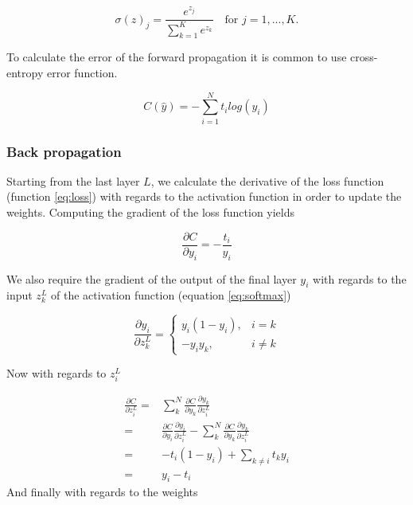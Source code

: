 \documentclass[thesis.tex]{subfiles}
\begin{document}
\begin{equation} %
  \sigma(z)_j = \frac{e^{z_j}}{\sum_{k=1}^{K} e^{z_k}} \quad \text{for } j = 1, ..., K.
  \label{eq:softmax}
\end{equation}

To calculate the error of the forward propagation it is common to use cross-entropy error function.

\begin{equation} %
  C(\hat{y}) = - \sum_{i=1}^N t_i log(y_i)
  \label{eq:loss}
\end{equation}


\subsubsection{Back propagation}
Starting from the last layer $L$, we calculate the derivative of the loss function (function \ref{eq:loss}) with regards to the activation function in order to update the weights. Computing the gradient of the loss function yields

\begin{equation}
  \frac{\partial C}{\partial y_i} = - \frac{t_i}{y_i}
\end{equation}

We also require the gradient of the output of the final layer $y_i$ with regards to the input $z_k^L$ of the activation function (equation \ref{eq:softmax})

\begin{equation}
  \frac{\partial y_i}{\partial z_k^L} = 
  \begin{cases}
      y_i(1 - y_i), & i = k\\
      -y_iy_k, & i \ne k
  \end{cases}
\end{equation}

Now with regards to $z_i^L$

\begin{equation}
  \begin{aligned}
  \frac{\partial C}{\partial z_i^L} = & \sum_k^N \frac{\partial C}{\partial y_k}\frac{\partial y_k}{\partial z_i^L} \\
  = & \frac{\partial C}{\partial y_i}\frac{\partial y_i}{\partial z_i^L} - \sum_k^N \frac{\partial C}{\partial y_k}\frac{\partial y_k}{\partial z_i^L} \\
  = & -t_i(1 - y_i) + \sum_{k \ne i}t_ky_i \\
  = & y_i - t_i
  \end{aligned}
\end{equation}
And finally with regards to the weights
\end{document}
